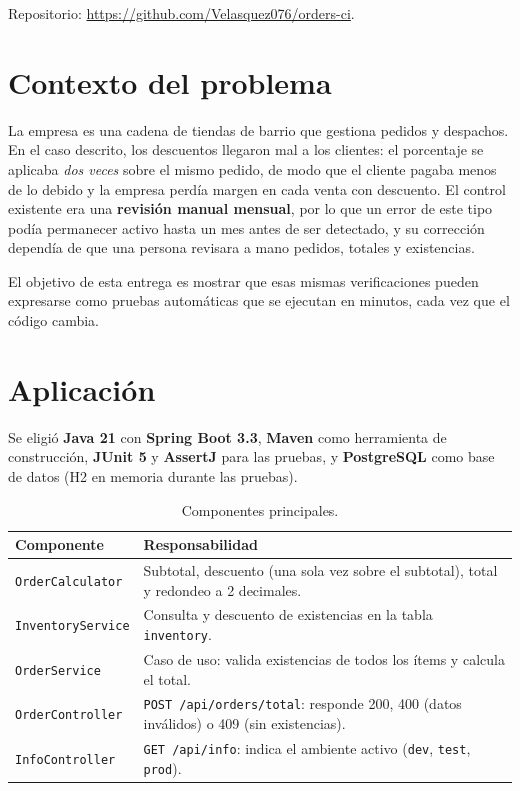 \documentclass[11pt,a4paper]{article}
\newcommand{\repositorio}{\url{https://github.com/Velasquez076/orders-ci}}
\begin{document}
Repositorio: \repositorio.

\section{Contexto del problema}

La empresa es una cadena de tiendas de barrio que gestiona pedidos y despachos. En el caso descrito,
los descuentos llegaron mal a los clientes: el porcentaje se aplicaba \emph{dos veces} sobre el mismo
pedido, de modo que el cliente pagaba menos de lo debido y la empresa perdía margen en cada venta con
descuento. El control existente era una \textbf{revisión manual mensual}, por lo que un error de este
tipo podía permanecer activo hasta un mes antes de ser detectado, y su corrección dependía de que una
persona revisara a mano pedidos, totales y existencias.

El objetivo de esta entrega es mostrar que esas mismas verificaciones pueden expresarse como pruebas
automáticas que se ejecutan en minutos, cada vez que el código cambia.

\section{Aplicación}
\label{sec:app}

Se eligió \textbf{Java 21} con \textbf{Spring Boot 3.3}, \textbf{Maven} como herramienta de
construcción, \textbf{JUnit 5} y \textbf{AssertJ} para las pruebas, y \textbf{PostgreSQL} como base
de datos (H2 en memoria durante las pruebas).

\begin{table}[H]
\centering
\begin{tabularx}{\textwidth}{@{}l L@{}}
\toprule
\textbf{Componente} & \textbf{Responsabilidad}\\
\midrule
\texttt{OrderCalculator} & Subtotal, descuento (una sola vez sobre el subtotal), total y redondeo a 2 decimales.\\
\texttt{InventoryService} & Consulta y descuento de existencias en la tabla \texttt{inventory}.\\
\texttt{OrderService} & Caso de uso: valida existencias de todos los ítems y calcula el total.\\
\texttt{OrderController} & \texttt{POST /api/orders/total}: responde 200, 400 (datos inválidos) o 409 (sin existencias).\\
\texttt{InfoController} & \texttt{GET /api/info}: indica el ambiente activo (\texttt{dev}, \texttt{test}, \texttt{prod}).\\
\bottomrule
\end{tabularx}
\caption{Componentes principales.}
\end{table}
\end{document}
